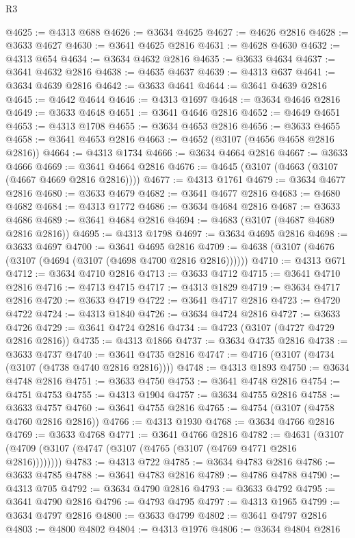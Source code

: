 \begin{lexlean}{R3}
\begin{coremodule}
@4625 := @4313 @688
@4626 := @3634 @4625
@4627 := @4626 @2816
@4628 := @3633 @4627
@4630 := @3641 @4625 @2816
@4631 := @4628 @4630
@4632 := @4313 @654
@4634 := @3634 @4632 @2816
@4635 := @3633 @4634
@4637 := @3641 @4632 @2816
@4638 := @4635 @4637
@4639 := @4313 @637
@4641 := @3634 @4639 @2816
@4642 := @3633 @4641
@4644 := @3641 @4639 @2816
@4645 := @4642 @4644
@4646 := @4313 @1697
@4648 := @3634 @4646 @2816
@4649 := @3633 @4648
@4651 := @3641 @4646 @2816
@4652 := @4649 @4651
@4653 := @4313 @1708
@4655 := @3634 @4653 @2816
@4656 := @3633 @4655
@4658 := @3641 @4653 @2816
@4663 := @4652 (@3107 (@4656 @4658 @2816 @2816))
@4664 := @4313 @1734
@4666 := @3634 @4664 @2816
@4667 := @3633 @4666
@4669 := @3641 @4664 @2816
@4676 := @4645 (@3107 (@4663 (@3107 (@4667 @4669 @2816 @2816))))
@4677 := @4313 @1761
@4679 := @3634 @4677 @2816
@4680 := @3633 @4679
@4682 := @3641 @4677 @2816
@4683 := @4680 @4682
@4684 := @4313 @1772
@4686 := @3634 @4684 @2816
@4687 := @3633 @4686
@4689 := @3641 @4684 @2816
@4694 := @4683 (@3107 (@4687 @4689 @2816 @2816))
@4695 := @4313 @1798
@4697 := @3634 @4695 @2816
@4698 := @3633 @4697
@4700 := @3641 @4695 @2816
@4709 := @4638 (@3107 (@4676 (@3107 (@4694 (@3107 (@4698 @4700 @2816 @2816))))))
@4710 := @4313 @671
@4712 := @3634 @4710 @2816
@4713 := @3633 @4712
@4715 := @3641 @4710 @2816
@4716 := @4713 @4715
@4717 := @4313 @1829
@4719 := @3634 @4717 @2816
@4720 := @3633 @4719
@4722 := @3641 @4717 @2816
@4723 := @4720 @4722
@4724 := @4313 @1840
@4726 := @3634 @4724 @2816
@4727 := @3633 @4726
@4729 := @3641 @4724 @2816
@4734 := @4723 (@3107 (@4727 @4729 @2816 @2816))
@4735 := @4313 @1866
@4737 := @3634 @4735 @2816
@4738 := @3633 @4737
@4740 := @3641 @4735 @2816
@4747 := @4716 (@3107 (@4734 (@3107 (@4738 @4740 @2816 @2816))))
@4748 := @4313 @1893
@4750 := @3634 @4748 @2816
@4751 := @3633 @4750
@4753 := @3641 @4748 @2816
@4754 := @4751 @4753
@4755 := @4313 @1904
@4757 := @3634 @4755 @2816
@4758 := @3633 @4757
@4760 := @3641 @4755 @2816
@4765 := @4754 (@3107 (@4758 @4760 @2816 @2816))
@4766 := @4313 @1930
@4768 := @3634 @4766 @2816
@4769 := @3633 @4768
@4771 := @3641 @4766 @2816
@4782 := @4631 (@3107 (@4709 (@3107 (@4747 (@3107 (@4765 (@3107 (@4769 @4771 @2816 @2816))))))))
@4783 := @4313 @722
@4785 := @3634 @4783 @2816
@4786 := @3633 @4785
@4788 := @3641 @4783 @2816
@4789 := @4786 @4788
@4790 := @4313 @705
@4792 := @3634 @4790 @2816
@4793 := @3633 @4792
@4795 := @3641 @4790 @2816
@4796 := @4793 @4795
@4797 := @4313 @1965
@4799 := @3634 @4797 @2816
@4800 := @3633 @4799
@4802 := @3641 @4797 @2816
@4803 := @4800 @4802
@4804 := @4313 @1976
@4806 := @3634 @4804 @2816

\end{coremodule}
\end{lexlean}
